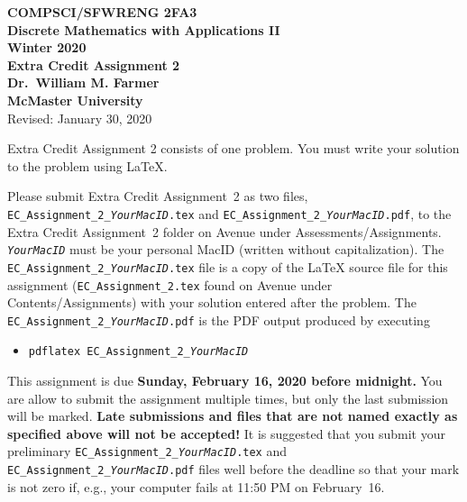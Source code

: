 \documentclass[11pt,fleqn]{article}
\newcommand{\bsp}{\begin{sloppypar}}
\newcommand{\esp}{\end{sloppypar}}
\begin{document}
\begin{center}

  {\large \textbf{COMPSCI/SFWRENG 2FA3}}\\[2mm]
  {\large \textbf{Discrete Mathematics with Applications II}}\\[2mm]
  {\large \textbf{Winter 2020}}\\[8mm]
  {\huge \textbf{Extra Credit Assignment 2}}\\[6mm]
  {\large \textbf{Dr.~William M. Farmer}}\\[2mm]
  {\large \textbf{McMaster University}}\\[6mm]
  {\large Revised: January 30, 2020}

\end{center}

\medskip

Extra Credit Assignment 2 consists of one problem.  You must write
your solution to the problem using LaTeX.

\bsp
Please submit Extra Credit Assignment~2 as two files,
\texttt{EC\_Assignment\_2\_\emph{YourMacID}.tex} and
\texttt{EC\_Assignment\_2\_\emph{YourMacID}.pdf}, to the Extra Credit
Assignment~2 folder on Avenue under Assessments/Assignments.
\texttt{\emph{YourMacID}} must be your personal MacID (written without
capitalization).  The \texttt{EC\_Assignment\_2\_\emph{YourMacID}.tex}
file is a copy of the LaTeX source file for this assignment
(\texttt{EC\_Assignment\_2.tex} found on Avenue under
Contents/Assignments) with your solution entered after the problem.
The \texttt{EC\_Assignment\_2\_\emph{YourMacID}.pdf} is the PDF output
produced by executing
\esp

\begin{itemize}

  \item[] \texttt{pdflatex EC\_Assignment\_2\_\emph{YourMacID}}

\end{itemize}

This assignment is due \textbf{Sunday, February 16, 2020 before
  midnight.}  You are allow to submit the assignment multiple times,
but only the last submission will be marked.  \textbf{Late submissions
  and files that are not named exactly as specified above will not be
  accepted!}  It is suggested that you submit your preliminary
\texttt{EC\_Assignment\_2\_\emph{YourMacID}.tex} and
\texttt{EC\_Assignment\_2\_\emph{YourMacID}.pdf} files well before the
deadline so that your mark is not zero if, e.g., your computer fails
at 11:50 PM on February~16.
\end{document}

